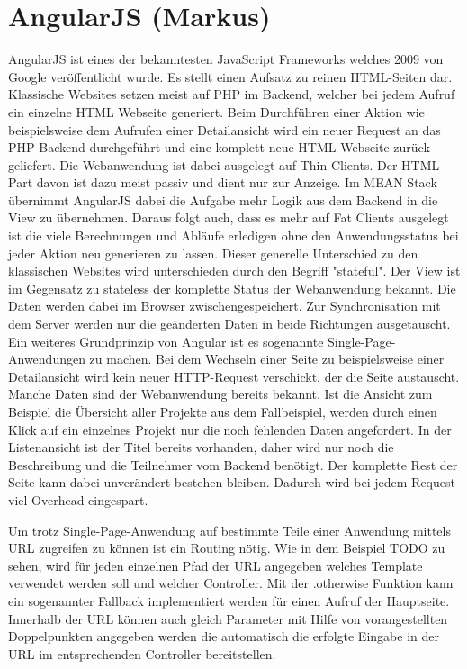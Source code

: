 \chapter{AngularJS (Markus)}
\label{angularjs}

AngularJS ist eines der bekanntesten JavaScript Frameworks welches 2009 von Google veröffentlicht wurde. 
Es stellt einen Aufsatz zu reinen HTML-Seiten dar. 
Klassische Websites setzen meist auf PHP im Backend, welcher bei jedem Aufruf ein einzelne HTML Webseite generiert.
Beim Durchführen einer Aktion wie beispielsweise dem Aufrufen einer Detailansicht wird ein neuer Request an das PHP Backend durchgeführt und eine komplett neue HTML Webseite zurück geliefert.
Die Webanwendung ist dabei ausgelegt auf Thin Clients.
Der HTML Part davon ist dazu meist passiv und dient nur zur Anzeige.
Im MEAN Stack übernimmt AngularJS dabei die Aufgabe mehr Logik aus dem Backend in die View zu übernehmen.
Daraus folgt auch, dass es mehr auf Fat Clients ausgelegt ist die viele Berechnungen und Abläufe erledigen ohne den Anwendungsstatus bei jeder Aktion neu generieren zu lassen.
Dieser generelle Unterschied zu den klassischen Websites wird unterschieden durch den Begriff "stateful".
Der View ist im Gegensatz zu stateless der komplette Status der Webanwendung bekannt.
Die Daten werden dabei im Browser zwischengespeichert.
Zur Synchronisation mit dem Server werden nur die geänderten Daten in beide Richtungen ausgetauscht.
Ein weiteres Grundprinzip von Angular ist es sogenannte Single-Page-Anwendungen zu machen.
Bei dem Wechseln einer Seite zu beispielsweise einer Detailansicht wird kein neuer HTTP-Request verschickt, der die Seite austauscht.
Manche Daten sind der Webanwendung bereits bekannt.
Ist die Ansicht zum Beispiel die Übersicht aller Projekte aus dem Fallbeispiel, werden durch einen Klick auf ein einzelnes Projekt nur die noch fehlenden Daten angefordert.
In der Listenansicht ist der Titel bereits vorhanden, daher wird nur noch die Beschreibung und die Teilnehmer vom Backend benötigt.
Der komplette Rest der Seite kann dabei unverändert bestehen bleiben.
Dadurch wird bei jedem Request viel Overhead eingespart.

Um trotz Single-Page-Anwendung auf bestimmte Teile einer Anwendung mittels URL zugreifen zu können ist ein Routing nötig.
Wie in dem Beispiel TODO zu sehen, wird für jeden einzelnen Pfad der URL angegeben welches Template verwendet werden soll und welcher Controller.
Mit der .otherwise Funktion kann ein sogenannter Fallback implementiert werden für einen Aufruf der Hauptseite.
Innerhalb der URL können auch gleich Parameter mit Hilfe von vorangestellten Doppelpunkten angegeben werden die automatisch die erfolgte Eingabe in der URL im entsprechenden Controller bereitstellen.

